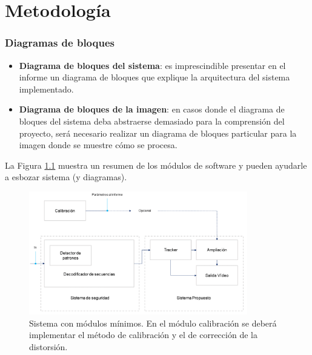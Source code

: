 \chapter{\textbf{Metodología}}
\label{chapter:metodologia}

\subsection*{Diagramas de bloques}
{}
\vspace{5mm}

\begin{itemize}
    \item \textbf{Diagrama de bloques del sistema}: es imprescindible presentar en el informe un diagrama de bloques que explique la arquitectura del sistema implementado.
    \item \textbf{Diagrama de bloques de la imagen}: en casos donde el diagrama de bloques del sistema deba abstraerse demasiado para la comprensión del proyecto, será necesario realizar un diagrama de bloques particular para la imagen donde se muestre cómo se procesa.
\end{itemize}

La Figura \ref{fig:diagrama} muestra un resumen de los módulos de software y pueden ayudarle a esbozar sistema (y diagramas).

\begin{figure}[H]
    \centering
    \includegraphics[width=0.85\textwidth]{Lab_Project/template/figures/diagrama.png}
    \caption{Sistema con módulos mínimos. En el módulo calibración se deberá implementar el método de calibración y el de corrección de la distorsión.}
    \label{fig:diagrama}
\end{figure}